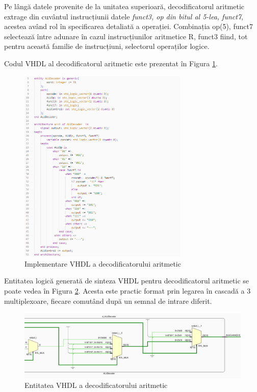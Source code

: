 \documentclass[12pt]{article}
\begin{document}
Pe lângă datele provenite de la unitatea superioară, decodificatorul aritmetic extrage din cuvântul instrucțiunii datele \textit{funct3, op din bitul al 5-lea, funct7}, acestea având rol în specificarea detaliată a operației. Combinația op(5), funct7 selectează între adunare în cazul instrucțiunilor aritmetice R, funct3 fiind, tot pentru această familie de instrucțiuni, selectorul operaților logice.

Codul VHDL al decodificatorul aritmetic este prezentat în Figura  \ref{Figura:46}.

  \begin{figure}[h!]
 \includegraphics[width=0.72\textwidth]{aludecodercode.png}
 \centering
 \caption{Implementare VHDL a decodificatorului aritmetic}
 \label{Figura:46}
 \end{figure}

\newpage

Entitatea logică generată de sinteza VHDL pentru decodificatorul aritmetic se poate vedea în Figura \ref{Figura:47}. Acesta este practic format prin legarea în cascadă a 3 multiplexoare, fiecare comutând după un semnal de intrare diferit.
 
  \begin{figure}[h!]
 \includegraphics[width=1.0\textwidth]{aludecoder2.png}
 \centering
 \caption{Entitatea VHDL a decodificatorului aritmetic}
 \label{Figura:47}
 \end{figure}
 
\end{document}
